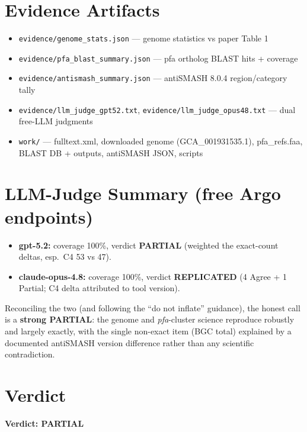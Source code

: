 \documentclass[11pt,a4paper]{article}
\begin{document}
\section{Evidence Artifacts}
\begin{itemize}[leftmargin=1.2cm]
\item \texttt{evidence/genome\_stats.json} --- genome statistics vs paper Table 1
\item \texttt{evidence/pfa\_blast\_summary.json} --- pfa ortholog BLAST hits + coverage
\item \texttt{evidence/antismash\_summary.json} --- antiSMASH 8.0.4 region/category tally
\item \texttt{evidence/llm\_judge\_gpt52.txt}, \texttt{evidence/llm\_judge\_opus48.txt} --- dual free-LLM judgments
\item \texttt{work/} --- fulltext.xml, downloaded genome (GCA\_001931535.1), pfa\_refs.faa, BLAST DB + outputs, antiSMASH JSON, scripts
\end{itemize}

\section{LLM-Judge Summary (free Argo endpoints)}
\begin{itemize}[leftmargin=1.2cm]
\item \textbf{gpt-5.2:} coverage 100\%, verdict \textbf{PARTIAL} (weighted the exact-count deltas, esp.\ C4 53 vs 47).
\item \textbf{claude-opus-4.8:} coverage 100\%, verdict \textbf{REPLICATED} (4 Agree + 1 Partial; C4 delta attributed to tool version).
\end{itemize}

Reconciling the two (and following the ``do not inflate'' guidance), the honest call is a \textbf{strong PARTIAL}: the genome and \textit{pfa}-cluster science reproduce robustly and largely exactly, with the single non-exact item (BGC total) explained by a documented antiSMASH version difference rather than any scientific contradiction.

\section*{Verdict}
\textbf{Verdict: PARTIAL}
\end{document}
